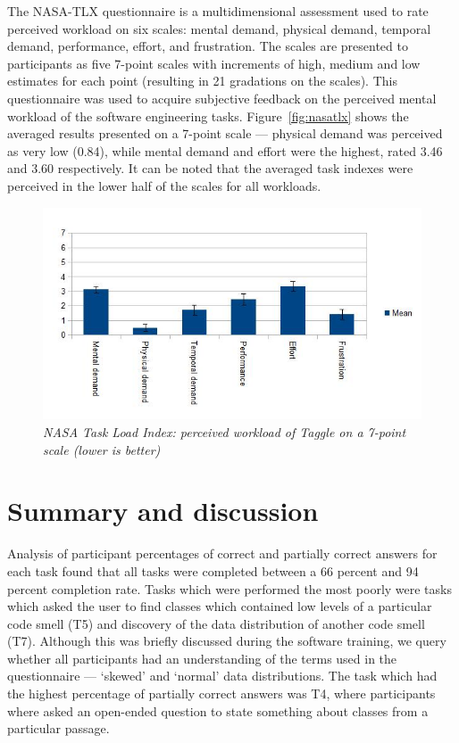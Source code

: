 The NASA-TLX\citep{hart88} questionnaire is a multidimensional assessment used to rate perceived workload on six scales: mental demand, physical demand, temporal demand, performance, effort, and frustration. The scales are presented to participants as five 7-point scales with increments of high, medium and low estimates for each point (resulting in 21 gradations on the scales). This questionnaire was used to acquire subjective feedback on the perceived mental workload of the software engineering tasks. Figure~\vref{fig:nasatlx} shows the averaged results presented on a 7-point scale --- physical demand was perceived as very low (0.84), while mental demand and effort were the highest, rated 3.46 and 3.60 respectively. It can be noted that the averaged task indexes were perceived in the lower half of the scales for all workloads.

\begin{figure}[!htb]
	\centering
	\includegraphics[scale=0.65]{nasatlx.jpg}
	\caption{\textit{NASA Task Load Index: perceived workload of Taggle on a 7-point scale (lower is better)}}
	\label{fig:nasatlx}
\end{figure}

\section{Summary and discussion}\label{sect:exp3summary}

Analysis of participant percentages of correct and partially correct answers for each task found that all tasks were completed between a 66 percent and 94 percent completion rate. Tasks which were performed the most poorly were tasks which asked the user to find classes which contained low levels of a particular code smell (T5) and discovery of the data distribution of another code smell (T7). Although this was briefly discussed during the software training, we query whether all participants had an understanding of the terms used in the questionnaire --- `skewed' and `normal' data distributions. The task which had the highest percentage of partially correct answers was T4, where participants where asked an open-ended question to state something about classes from a particular passage.

